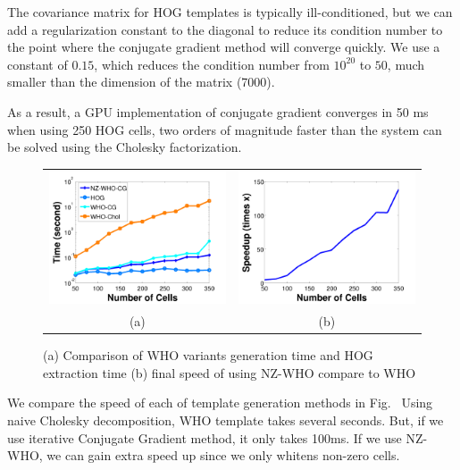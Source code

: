 \documentclass[10pt,twocolumn,letterpaper]{article}
\begin{document}
The covariance matrix for HOG templates is typically ill-conditioned\cite{Hariharan12}, but we
can add a regularization constant to the diagonal to reduce its condition
number to the point where the conjugate gradient method will converge quickly.
We use a constant of $0.15$, which reduces the condition number from $10^{20}$
to $50$, much smaller than the dimension of the matrix (7000).

As a result, a GPU implementation of conjugate gradient converges in 50
ms when using 250 HOG cells, two orders of magnitude faster than the system can be solved using the
Cholesky factorization.

\begin{figure}[t]
  \begin{center}
  \begin{tabular}{cc}
     \includegraphics[width=0.5\linewidth]{whotime} & 
     \includegraphics[width=0.5\linewidth]{speedup}\\
     (a) & (b) \\
 \end{tabular}
  \end{center}
  \caption{(a) Comparison of WHO variants generation time and HOG extraction time (b) final speed of using NZ-WHO compare to WHO}
  \label{fig:whotime}
\end{figure}

We compare the speed of each of template generation methods in
Fig.~\cite{fig:covariancetime_crop} Using naive Cholesky decomposition,
WHO template takes several seconds. But, if we use iterative Conjugate Gradient method, it only
takes 100ms. If we use NZ-WHO, we can gain extra speed up since we only whitens non-zero cells.
\end{document}
